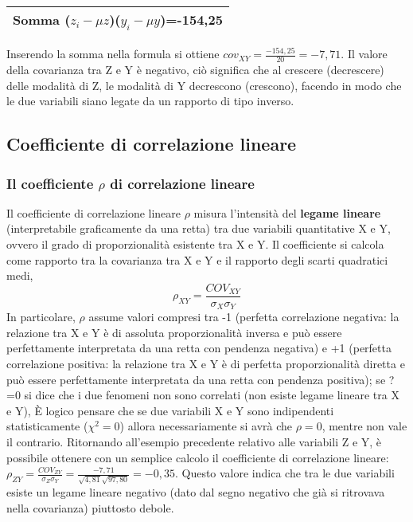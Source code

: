 \begin{esempio}
\vspace{6pt}
\begin{tabular}{|c|}
\hline
Somma ($z_i-\mu z$)($y_i-\mu y$)=-154,25\\
\hline
\end{tabular}

\vspace{6pt}
Inserendo la somma nella formula si ottiene 
$cov_{XY}=\frac{-154,25}{20}=-7,71$.
Il valore della covarianza tra Z e Y è negativo, ciò significa che al 
crescere (decrescere) delle modalità di Z, le modalità di Y decrescono 
(crescono), facendo in modo che le due variabili siano legate da un 
rapporto di tipo inverso.
\end{esempio}

\subsection{Coefficiente di correlazione lineare}

\subsubsection{Il coefficiente $\rho$ di correlazione lineare}

Il coefficiente di correlazione lineare $\rho$ misura l'intensità del 
\textbf{legame lineare} (interpretabile graficamente da una retta) tra due 
variabili quantitative X e Y, ovvero il grado di proporzionalità esistente 
tra X e Y.
Il coefficiente si calcola come rapporto tra la covarianza tra X e Y e il 
rapporto degli scarti quadratici medi, 
$$\rho_{XY}=\frac{COV_{XY}}{\sigma_X\sigma_Y}$$
 In particolare, $\rho$ assume valori compresi tra -1 (perfetta 
correlazione negativa: la relazione tra X e Y è di assoluta proporzionalità 
inversa e può essere perfettamente interpretata da una retta con pendenza 
negativa) e +1 (perfetta correlazione positiva: la relazione tra X e Y è di 
perfetta proporzionalità diretta e può essere perfettamente interpretata da 
una retta con pendenza positiva); se ?=0 si dice che i due fenomeni non sono 
correlati (non esiste legame lineare tra X e Y),  È logico pensare che se 
due variabili X e Y sono indipendenti statisticamente ($\chi^2=0$) allora 
necessariamente si avrà che $\rho=0$, mentre non vale il contrario.
 Ritornando all'esempio precedente relativo alle variabili Z e Y, è 
possibile ottenere con un semplice calcolo il coefficiente di correlazione 
lineare: 
$\rho_{ZY}=\frac{COV_{ZY}}{\sigma_Z\sigma_Y}=\frac{-7,71}{\sqrt{4,81}\sqrt{
97,80}}=-0,35$.
 Questo valore indica che tra le due variabili esiste un legame lineare 
negativo (dato dal segno negativo che già si ritrovava nella covarianza) 
piuttosto debole.
 
